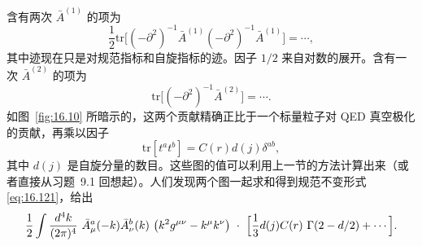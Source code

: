 含有两次 $\bar{A}^{(1)}$ 的项为
\begin{equation}
  \frac{1}{2}\mathrm{tr}\bigl[ (-\partial^2)^{-1}\bar{A}^{(1)}
    (-\partial^2)^{-1}\bar{A}^{(1)} \bigr] = \cdots ,
  \label{eq:16.122}
\end{equation}
其中迹现在只是对规范指标和自旋指标的迹。因子 $1/2$ 来自对数的展开。含有一次 $\bar{A}^{(2)}$ 的项为
\begin{equation}
  \mathrm{tr}\bigl[ (-\partial^2)^{-1}\bar{A}^{(2)} \bigr] = \cdots .
  \label{eq:16.123}
\end{equation}
如图~\ref{fig:16.10} 所暗示的，这两个贡献精确正比于一个标量粒子对 QED 真空极化的贡献，再乘以因子
\begin{equation}
  \mathrm{tr}[t^at^b] = C(r)d(j)\delta^{ab} ,
  \label{eq:16.124}
\end{equation}
其中 $d(j)$ 是自旋分量的数目。这些图的值可以利用上一节的方法计算出来（或者直接从习题~9.1 回想起）。人们发现两个图一起求和得到规范不变形式 \eqref{eq:16.121}，给出
\begin{equation}
  \frac{1}{2}\int \frac{d^4k}{(2\pi)^4}\ \bar{A}^a_\mu(-k)\bar{A}^b_\nu(k)\
    \bigl( k^2g^{\mu\nu} - k^\mu k^\nu \bigr)\ \cdot\
    \Bigl[ \frac{1}{3}d(j)C(r)\ \Gamma(2-d/2) + \cdots \Bigr] .
  \label{eq:16.125}
\end{equation}

